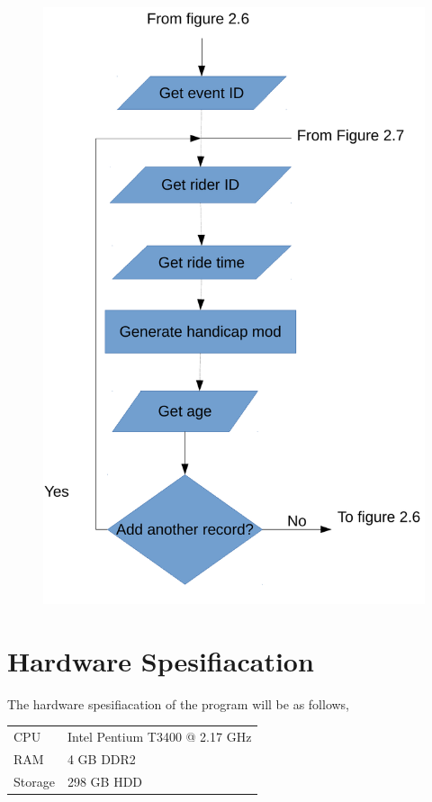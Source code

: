 \begin{figure}[H]
	\includegraphics[width=\textwidth]{./FlowChart/SectionSix.pdf}
	\caption{} \label{fig:} 	
\end{figure}

\section{Hardware Spesifiacation}

The hardware spesifiacation of the program will be as follows,

\begin{tabular}{ll}
CPU & Intel Pentium T3400 @ 2.17 GHz\\
RAM & 4 GB DDR2 \\
Storage & 298 GB HDD \\
\end{tabular}

